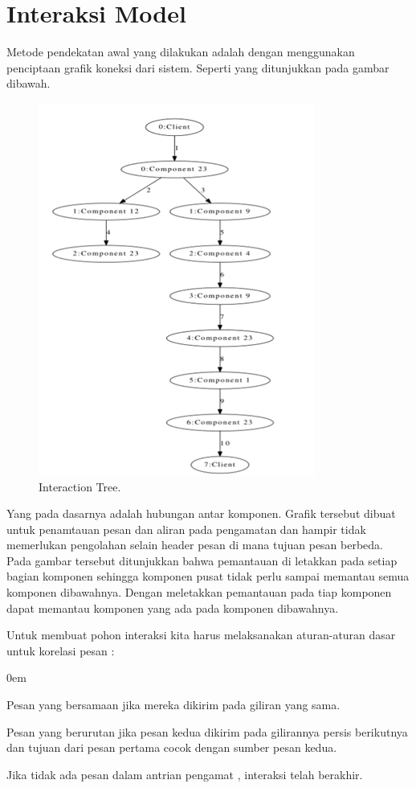 \documentclass{jtetiproposalskripsi}
\begin{document}
\section{Interaksi Model}
Metode pendekatan awal yang dilakukan adalah dengan menggunakan penciptaan grafik koneksi dari sistem. Seperti yang ditunjukkan pada gambar dibawah.
\begin{figure}[ht!]
  \centering
    \includegraphics{gambar/9}
    \caption{Interaction Tree.}
    \label{Interaction Tree}
\end{figure}

Yang pada dasarnya adalah hubungan antar komponen. Grafik tersebut dibuat untuk penamtauan pesan dan aliran pada pengamatan dan hampir tidak memerlukan pengolahan selain header pesan di mana tujuan pesan berbeda. Pada gambar tersebut ditunjukkan bahwa pemantauan di letakkan pada setiap bagian komponen sehingga komponen pusat tidak perlu sampai memantau semua komponen dibawahnya. Dengan meletakkan pemantauan pada tiap komponen dapat memantau komponen yang ada pada komponen dibawahnya.

Untuk membuat pohon interaksi kita harus melaksanakan aturan-aturan dasar untuk korelasi pesan :

\begin{enumerate}[a.]
\begin{singlespace}
\itemsep0em
\item Pesan yang bersamaan jika mereka dikirim pada giliran yang sama.
\item Pesan yang berurutan jika pesan kedua dikirim pada gilirannya persis berikutnya dan tujuan dari pesan pertama cocok dengan sumber pesan kedua.
\item Jika tidak ada pesan dalam antrian pengamat , interaksi telah berakhir.
\end{singlespace}
\end{enumerate}
\end{document}
